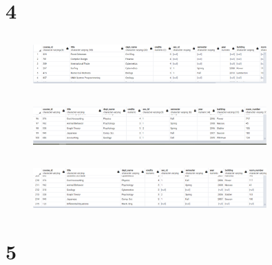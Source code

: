 \documentclass{article}
\begin{document}
\section{4}
\subsection{}
\begin{figure}[H]
    \centering
    \includegraphics[width=0.8\textwidth]{figures/4-a.png}
    \caption
	{
	}
    \label{fig:fig1}
\end{figure}

\subsection{}
\begin{figure}[H]
    \centering
    \includegraphics[width=0.8\textwidth]{figures/4-b.png}
    \caption
	{
	}
    \label{fig:fig1}
\end{figure}

\subsection{}
\begin{figure}[H]
    \centering
    \includegraphics[width=0.8\textwidth]{figures/4-c.png}
    \caption
	{
	}
    \label{fig:fig1}
\end{figure}

\section{5}
\end{document}
